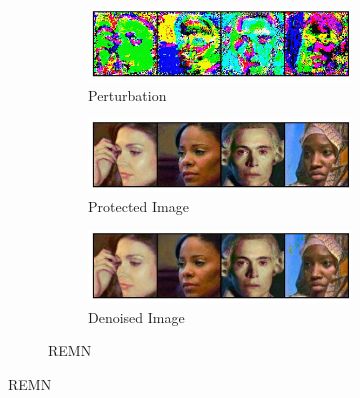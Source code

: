 \documentclass[conference]{IEEEtran}
\theoremstyle{definition}
\theoremstyle{remark}
\theoremstyle{proposition}
\begin{document}
\begin{figure}[p!]
\begin{subfigure}{1.0\textwidth}
\begin{center}
        	\begin{subfigure}{.5\textwidth}
        		\centering
        		\includegraphics[width=1.0\textwidth, valign=c]{webface/pert_rem16.jpg}
                \caption*{Perturbation}
        	\end{subfigure}
        \end{center}
    	\begin{subfigure}{.5\textwidth}
    		\centering
    		\includegraphics[width=1.0\textwidth, valign=c]{webface/pois_rem16.jpg}
            \caption*{Protected Image}
    	\end{subfigure}
    	\begin{subfigure}{.5\textwidth}
    		\centering
    		\includegraphics[width=1.0\textwidth, valign=c]{webface/san_rem16.jpg}
            \caption*{Denoised Image}
    	\end{subfigure}
	\caption{REMN~\citep{huang2021emn}}
    \end{subfigure}
\end{figure}
\end{document}
